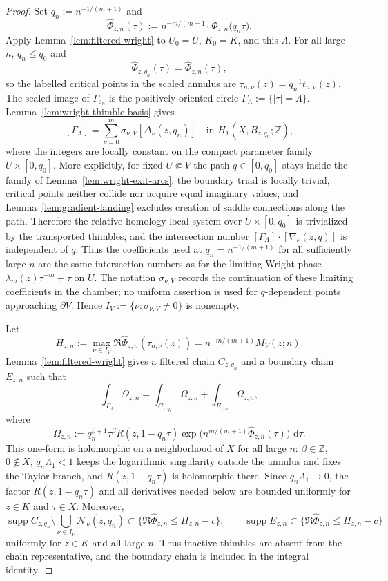 \documentclass[10pt,a4paper]{amsart}
\newcommand{\dd}{\,\mathrm d}
\begin{document}
\begin{proof}
Set $q_n:=n^{-1/(m+1)}$ and
$$\widehat\Phi_{z,n}(\tau):=n^{-m/(m+1)}\Phi_{z,n}\!\bigl(q_n\tau\bigr).$$
Apply Lemma~\ref{lem:filtered-wright} to $U_0=U$, $K_0=K$, and this $\Lambda$. For all large $n$, $q_n\le q_0$ and
$$\widehat\Phi_{z,q_n}(\tau)=\widehat\Phi_{z,n}(\tau),$$
so the labelled critical points in the scaled annulus are $\tau_{n,\nu}(z)=q_n^{-1}t_{n,\nu}(z)$. The scaled image of $\Gamma_{\varepsilon_n}$ is the positively oriented circle $\Gamma_\Lambda:=\{|\tau|=\Lambda\}$. Lemma~\ref{lem:wright-thimble-basis} gives
$$[\Gamma_\Lambda]=\sum_{\nu=0}^m\sigma_{\nu,V}[\Delta_\nu(z,q_n)]
\quad\text{in }H_1(X,B_{z,q_n};\mathbb Z),$$
where the integers are locally constant on the compact parameter family $\overline U\times[0,q_0]$. More explicitly, for fixed $U\Subset V$ the path $q\in[0,q_0]$ stays inside the family of Lemma~\ref{lem:wright-exit-arcs}: the boundary triad is locally trivial, critical points neither collide nor acquire equal imaginary values, and Lemma~\ref{lem:gradient-landing} excludes creation of saddle connections along the path. Therefore the relative homology local system over $\overline U\times[0,q_0]$ is trivialized by the transported thimbles, and the intersection number $[\Gamma_\Lambda]\cdot[\nabla_\nu(z,q)]$ is independent of $q$. Thus the coefficients used at $q_n=n^{-1/(m+1)}$ for all sufficiently large $n$ are the same intersection numbers as for the limiting Wright phase $\lambda_m(z)\tau^{-m}+\tau$ on $U$. The notation $\sigma_{\nu,V}$ records the continuation of these limiting coefficients in the chamber; no uniform assertion is used for $q$-dependent points approaching $\partial V$. Hence $I_V:=\{\nu:\sigma_{\nu,V}\ne0\}$ is nonempty.

Let
$$H_{z,n}:=\max_{\nu\in I_V}\Re\widehat\Phi_{z,n}(\tau_{n,\nu}(z))=n^{-m/(m+1)}M_V(z;n).$$
Lemma~\ref{lem:filtered-wright} gives a filtered chain $C_{z,q_n}$ and a boundary chain $E_{z,n}$ such that
$$\int_{\Gamma_\Lambda}\Omega_{z,n}=\int_{C_{z,q_n}}\Omega_{z,n}+\int_{E_{z,n}}\Omega_{z,n},$$
where
$$\Omega_{z,n}:=q_n^{\beta+1}\tau^\beta R(z,1-q_n\tau)
\exp\!\bigl(n^{m/(m+1)}\widehat\Phi_{z,n}(\tau)\bigr)\,\dd\tau.$$
This one-form is holomorphic on a neighborhood of $X$ for all large $n$: $\beta\in\mathbb Z$, $0\notin X$, $q_n\Lambda_1<1$ keeps the logarithmic singularity outside the annulus and fixes the Taylor branch, and $R(z,1-q_n\tau)$ is holomorphic there. Since $q_n\Lambda_1\to0$, the factor $R(z,1-q_n\tau)$ and all derivatives needed below are bounded uniformly for $z\in K$ and $\tau\in X$. Moreover,
$$\operatorname{supp}C_{z,q_n}\setminus\bigcup_{\nu\in I_V}\mathcal N_\nu(z,q_n)
\subset\{\Re\widehat\Phi_{z,n}\le H_{z,n}-c\},
\qquad
\operatorname{supp}E_{z,n}\subset\{\Re\widehat\Phi_{z,n}\le H_{z,n}-c\}$$
uniformly for $z\in K$ and all large $n$. Thus inactive thimbles are absent from the chain representative, and the boundary chain is included in the integral identity.


\end{proof}
\end{document}
